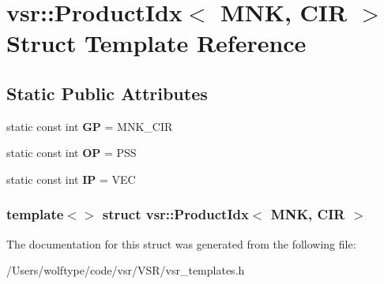 \hypertarget{structvsr_1_1_product_idx_3_01_m_n_k_00_01_c_i_r_01_4}{\section{vsr\-:\-:Product\-Idx$<$ M\-N\-K, C\-I\-R $>$ Struct Template Reference}
\label{structvsr_1_1_product_idx_3_01_m_n_k_00_01_c_i_r_01_4}
}
\subsection*{Static Public Attributes}
\begin{DoxyCompactItemize}
\item 
\hypertarget{structvsr_1_1_product_idx_3_01_m_n_k_00_01_c_i_r_01_4_a6c1207bcfbca03af26b01525df29b3d5}{static const int {\bfseries G\-P} = M\-N\-K\-\_\-\-C\-I\-R}\label{structvsr_1_1_product_idx_3_01_m_n_k_00_01_c_i_r_01_4_a6c1207bcfbca03af26b01525df29b3d5}

\item 
\hypertarget{structvsr_1_1_product_idx_3_01_m_n_k_00_01_c_i_r_01_4_a484af17a5189757b0217770211ed447e}{static const int {\bfseries O\-P} = P\-S\-S}\label{structvsr_1_1_product_idx_3_01_m_n_k_00_01_c_i_r_01_4_a484af17a5189757b0217770211ed447e}

\item 
\hypertarget{structvsr_1_1_product_idx_3_01_m_n_k_00_01_c_i_r_01_4_a8af90667bcd75907c295b02786e2558e}{static const int {\bfseries I\-P} = V\-E\-C}\label{structvsr_1_1_product_idx_3_01_m_n_k_00_01_c_i_r_01_4_a8af90667bcd75907c295b02786e2558e}

\end{DoxyCompactItemize}
\subsubsection*{template$<$$>$ struct vsr\-::\-Product\-Idx$<$ M\-N\-K, C\-I\-R $>$}



The documentation for this struct was generated from the following file\-:\begin{DoxyCompactItemize}
\item 
/\-Users/wolftype/code/vsr/\-V\-S\-R/vsr\-\_\-templates.\-h\end{DoxyCompactItemize}
